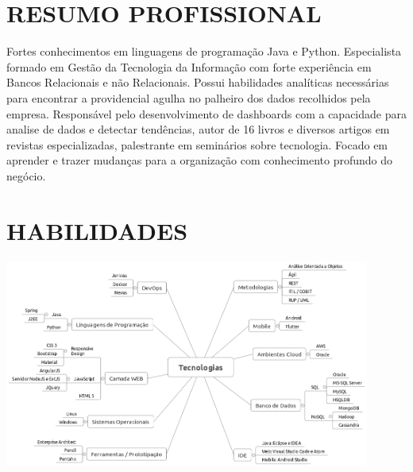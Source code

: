 \documentclass{res}
\begin{document}
	
	\thispagestyle{empty} %
	\address{{\bf Brasília} -- Asa Norte \\
		Tel. (61) 99874.0763 \\  Tel.Recado (61) 3201.5834}
	
	\begin{resume}
		
		\section{RESUMO PROFISSIONAL}
		\vspace{8pt}
		Fortes conhecimentos em linguagens de programação Java e Python. Especialista formado em Gestão da Tecnologia da Informação com forte experiência em Bancos Relacionais e não Relacionais. Possui habilidades analíticas necessárias para encontrar a providencial agulha no palheiro dos dados recolhidos pela empresa. Responsável pelo desenvolvimento de dashboards com a capacidade para analise de dados e detectar tendências, autor de 16 livros e diversos artigos em revistas especializadas, palestrante em seminários sobre tecnologia. Focado em aprender e trazer mudanças para a organização com conhecimento profundo do negócio.
		
		\section{HABILIDADES}
		\vspace{8pt}
		\includegraphics[width=0.9\textwidth]{imagens/tecnologias.png}
		

\end{resume}
\end{document}
